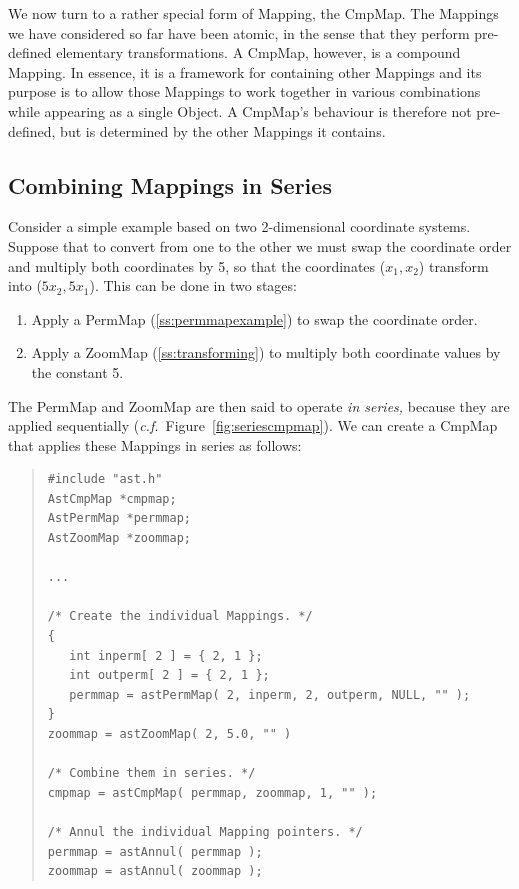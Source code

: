\documentclass[twoside,11pt]{article}
\newcommand{\htmlref}[2]{#1}
\newcommand{\secref}[1]{\S\ref{#1}}
\renewcommand{\secref}[1]{\ref{#1}}
\begin{document}
We now turn to a rather special form of \htmlref{Mapping}{Mapping}, the \htmlref{CmpMap}{CmpMap}. The
Mappings we have considered so far have been atomic, in the sense that
they perform pre-defined elementary transformations. A CmpMap,
however, is a compound Mapping. In essence, it is a framework for
containing other Mappings and its purpose is to allow those Mappings
to work together in various combinations while appearing as a single
\htmlref{Object}{Object}. A CmpMap's behaviour is therefore not pre-defined, but is
determined by the other Mappings it contains.

\subsection{\label{ss:seriescmpmap}Combining Mappings in Series}

Consider a simple example based on two 2-dimensional coordinate
systems. Suppose that to convert from one to the other we must swap
the coordinate order and multiply both coordinates by 5, so that the
coordinates ($x_1,x_2$) transform into ($5x_2,5x_1$). This can be done
in two stages:

\begin{enumerate}
\item Apply a \htmlref{PermMap}{PermMap} (\secref{ss:permmapexample}) to swap the
coordinate order.

\item Apply a \htmlref{ZoomMap}{ZoomMap} (\secref{ss:transforming}) to multiply both
coordinate values by the constant 5.
\end{enumerate}

The PermMap and ZoomMap are then said to operate {\em{in series,}}
because they are applied sequentially
({\em{c.f.}}\ Figure~\ref{fig:seriescmpmap}).  We can create a \htmlref{CmpMap}{CmpMap}
that applies these Mappings in series as follows:

\begin{quote}
\small
\begin{verbatim}
#include "ast.h"
AstCmpMap *cmpmap;
AstPermMap *permmap;
AstZoomMap *zoommap;

...

/* Create the individual Mappings. */
{
   int inperm[ 2 ] = { 2, 1 };
   int outperm[ 2 ] = { 2, 1 };
   permmap = astPermMap( 2, inperm, 2, outperm, NULL, "" );
}
zoommap = astZoomMap( 2, 5.0, "" )

/* Combine them in series. */
cmpmap = astCmpMap( permmap, zoommap, 1, "" );

/* Annul the individual Mapping pointers. */
permmap = astAnnul( permmap );
zoommap = astAnnul( zoommap );
\end{verbatim}
\normalsize
\end{quote}
\end{document}
